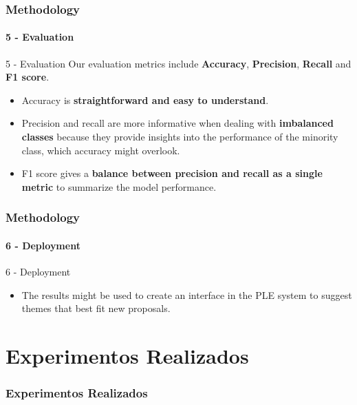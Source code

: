 \begin{frame}
	\frametitle{Methodology}
	\framesubtitle{5 - Evaluation}	
	
	\begin{block}{5 - Evaluation} 
			Our evaluation metrics include \textbf{Accuracy}, \textbf{Precision}, \textbf{Recall} and \textbf{F1 score}.
	\end{block}

	\begin{block}{} 
		\begin{itemize}
			\item Accuracy is \textbf{straightforward and easy to understand}.
			\item Precision and recall are more informative when dealing with \textbf{imbalanced classes} because they provide insights into the performance of the minority class, which accuracy might overlook.
			
			\item F1 score gives a \textbf{balance between precision and recall as a single metric} to summarize the model performance.
		\end{itemize}
	\end{block}
\end{frame}
\begin{frame}
	\frametitle{Methodology}
	\framesubtitle{6 - Deployment}	
	
	\begin{block}{6 - Deployment} 
		\begin{itemize}
			\item The results might be used to create an interface in the PLE system to suggest themes that best fit new proposals.
		\end{itemize}
	\end{block}
\end{frame}



\section{Experimentos Realizados}
\begin{frame}
\frametitle{Experimentos Realizados}
	
	
	
	
\end{frame}
